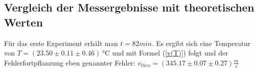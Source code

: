 \documentclass[]{article}
\begin{document}
	\subsection{Vergleich der Messergebnisse mit theoretischen Werten}

	Für das erste Experiment erhält man $t=82min$. Es ergibt sich eine Temperatur von $T=(23.50 \pm 0.11 \pm 0.46)\SI{}{\celsius}$ und mit Formel (\ref{v(T)}) folgt und der Fehlerfortpflanzung eben genannter Fehler: $v_{theo}=(345.17 \pm 0.07 \pm 0.27)\frac{m}{s}$

	
\end{document}
